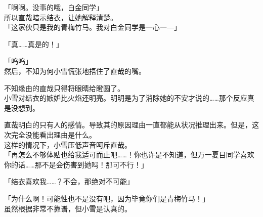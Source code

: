 「啊啊。没事的哦，白金同学」\\

所以直哉暗示结衣，让她解释清楚。\\

「这家伙只是我的青梅竹马。我对白金同学是一心一—」

「真……真是的！」

「呜呜」\\

然后，不知为何小雪慌张地捂住了直哉的嘴。

不知缘由的直哉只得将眼睛给瞪圆了。\\

小雪对结衣的嫉妒比火焰还明亮。明明是为了消除她的不安才说的……那个反应真是没想到。

直哉明白的只有人的感情。导致其的原因理由一直都能从状况推理出来。但是，这次完全没能看出理由是什么。\\

这样的情况下，小雪压低声音呵斥直哉。\\

「再怎么不够体贴也给我适可而止吧……！你也许是不知道，但万一夏目同学喜欢你的话……那不是会伤害到她吗！那可不行！」

「结衣喜欢我……？不会，那绝对不可能」

「为什么啊！可能性也不是没有吧，因为毕竟你们是青梅竹马！」\\

虽然根据非常不靠谱，但小雪是认真的。

